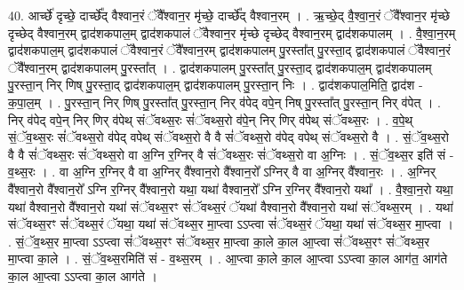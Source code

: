 \documentclass[17pt]{extarticle}
\begin{document}
40. आर्च्छे॑ दृच्छे॒ दार्च्छे᳚द् वैश्वान॒रं ॅवै᳚श्वान॒र मृ॑च्छे॒ दार्च्छे᳚द् वैश्वान॒रम् । . ऋ॒च्छे॒द् वै॒श्वा॒न॒रं ॅवै᳚श्वान॒र मृ॑च्छे दृच्छेद् वैश्वान॒रम् द्वाद॑शकपाल॒म् द्वाद॑शकपालं ॅवैश्वान॒र मृ॑च्छे दृच्छेद् वैश्वान॒रम् द्वाद॑शकपालम् । . वै॒श्वा॒न॒रम् द्वाद॑शकपाल॒म् द्वाद॑शकपालं ॅवैश्वान॒रं ॅवै᳚श्वान॒रम् द्वाद॑शकपालम् पु॒रस्ता᳚त् पु॒रस्ता॒द् द्वाद॑शकपालं ॅवैश्वान॒रं ॅवै᳚श्वान॒रम् द्वाद॑शकपालम् पु॒रस्ता᳚त् । . द्वाद॑शकपालम् पु॒रस्ता᳚त् पु॒रस्ता॒द् द्वाद॑शकपाल॒म् द्वाद॑शकपालम् पु॒रस्ता॒न् निर् णिष् पु॒रस्ता॒द् द्वाद॑शकपाल॒म् द्वाद॑शकपालम् पु॒रस्ता॒न् निः । . द्वाद॑शकपाल॒मिति॒ द्वाद॑श - क॒पा॒ल॒म् । . पु॒रस्ता॒न् निर् णिष् पु॒रस्ता᳚त् पु॒रस्ता॒न् निर् व॑पेद् वपे॒न् निष् पु॒रस्ता᳚त् पु॒रस्ता॒न् निर् व॑पेत् । . निर् व॑पेद् वपे॒न् निर् णिर् व॑पेथ् संॅवथ्स॒रः सं॑ॅवथ्स॒रो व॑पे॒न् निर् णिर् व॑पेथ् संॅवथ्स॒रः । . व॒पे॒थ् सं॒ॅव॒थ्स॒रः सं॑ॅवथ्स॒रो व॑पेद् वपेथ् संॅवथ्स॒रो वै वै सं॑ॅवथ्स॒रो व॑पेद् वपेथ् संॅवथ्स॒रो वै । . सं॒ॅव॒थ्स॒रो वै वै सं॑ॅवथ्स॒रः सं॑ॅवथ्स॒रो वा अ॒ग्नि र॒ग्निर् वै सं॑ॅवथ्स॒रः सं॑ॅवथ्स॒रो वा अ॒ग्निः । . सं॒ॅव॒थ्स॒र इति॑ सं - व॒थ्स॒रः । . वा अ॒ग्नि र॒ग्निर् वै वा अ॒ग्निर् वै᳚श्वान॒रो वै᳚श्वान॒रो᳚ ऽग्निर् वै वा अ॒ग्निर् वै᳚श्वान॒रः । . अ॒ग्निर् वै᳚श्वान॒रो वै᳚श्वान॒रो᳚ ऽग्नि र॒ग्निर् वै᳚श्वान॒रो यथा॒ यथा॑ वैश्वान॒रो᳚ ऽग्नि र॒ग्निर् वै᳚श्वान॒रो यथा᳚ । . वै॒श्वा॒न॒रो यथा॒ यथा॑ वैश्वान॒रो वै᳚श्वान॒रो यथा॑ संॅवथ्स॒रꣳ सं॑ॅवथ्स॒रं ॅयथा॑ वैश्वान॒रो वै᳚श्वान॒रो यथा॑ संॅवथ्स॒रम् । . यथा॑ संॅवथ्स॒रꣳ सं॑ॅवथ्स॒रं ॅयथा॒ यथा॑ संॅवथ्स॒र मा॒प्त्वा ऽऽप्त्वा सं॑ॅवथ्स॒रं ॅयथा॒ यथा॑ संॅवथ्स॒र मा॒प्त्वा । . सं॒ॅव॒थ्स॒र मा॒प्त्वा ऽऽप्त्वा सं॑ॅवथ्स॒रꣳ सं॑ॅवथ्स॒र मा॒प्त्वा का॒ले का॒ल आ॒प्त्वा सं॑ॅवथ्स॒रꣳ सं॑ॅवथ्स॒र मा॒प्त्वा का॒ले । . सं॒ॅव॒थ्स॒रमिति॑ सं - व॒थ्स॒रम् । . आ॒प्त्वा का॒ले का॒ल आ॒प्त्वा ऽऽप्त्वा का॒ल आग॑त॒ आग॑ते का॒ल आ॒प्त्वा ऽऽप्त्वा का॒ल आग॑ते । \newline
\pagebreak
{}
\end{document}
